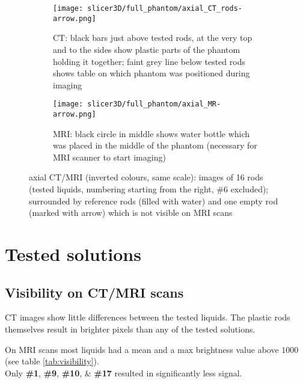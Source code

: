 \begin{figure}[!tbp]
  \begin{subfigure}[b]{\textwidth}
    \texttt{[image: slicer3D/full\_phantom/axial\_CT\_rods-arrow.png]}
    \caption{CT: black bars just above tested rods, at the very top and to the sides show plastic parts of the phantom holding it together; faint grey line below tested rods shows table on which phantom was positioned during imaging}
    \label{fig:axial_CT_rods}
  \end{subfigure}
  \begin{subfigure}[b]{\textwidth}
    \texttt{[image: slicer3D/full\_phantom/axial\_MR-arrow.png]}
    \caption{MRI: black circle in middle shows water bottle which was placed in the middle of the phantom (necessary for MRI scanner to start imaging)}
    \label{fig:axial_MR}
  \end{subfigure}
  \caption{axial CT/MRI (inverted colours, same scale): images of 16 rods (tested liquids, numbering starting from the right, \#6 excluded); surrounded by reference rods (filled with water) and one empty rod (marked with arrow) which is not visible on MRI scans}
  \label{fig:axial}
\end{figure}


\section{Tested solutions}

\subsection{Visibility on CT/MRI scans}

CT images show little differences between the tested liquids. The plastic rods themselves result in brighter pixels than any of the tested solutions.

On MRI scans most liquids had a mean and a max brightness value above $1000$ (see table \ref{tab:visibility}).\\
Only \textbf{\#1}, \textbf{\#9}, \textbf{\#10}, \& \textbf{\#17} resulted in significantly less signal.


